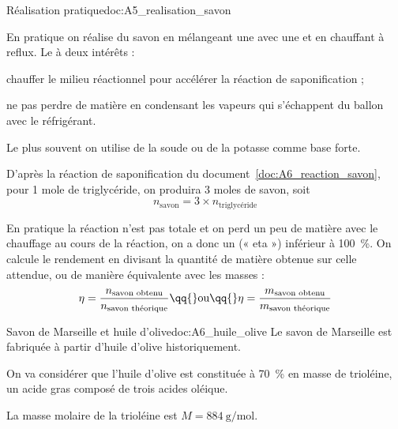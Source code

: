 \begin{doc}{Réalisation pratique}{doc:A5_realisation_savon}
  \begin{wrapfigure}{r}{0.4\linewidth}
    \centering
    \vspace*{-32pt}
  \end{wrapfigure}
  En pratique on réalise du savon en mélangeant une  avec une  et en chauffant à reflux.
  Le  à deux intérêts :
  \begin{listePoints}
    \item chauffer le milieu réactionnel pour accélérer la réaction de saponification ;
    \item ne pas perdre de matière en condensant les vapeurs qui s'échappent du ballon avec le réfrigérant.
  \end{listePoints}

  Le plus souvent on utilise de la soude  ou de la potasse  comme base forte.

  D'après la réaction de saponification du document~\ref{doc:A6_reaction_savon}, pour 1 mole de triglycéride, on produira 3 moles de savon, soit
  \begin{equation*}
    n_\text{savon} = 3\times n_\text{triglycéride}
  \end{equation*}

  En pratique la réaction n'est pas totale et on perd un peu de matière avec le chauffage au cours de la réaction, on a donc un  (« eta »)  inférieur à \qty{100}{\percent}.
  On calcule le rendement en divisant la quantité de matière obtenue sur celle attendue, ou de manière équivalente avec les masses :
  \begin{equation*}
    \eta = \dfrac{n_\text{savon obtenu}}{n_\text{savon théorique}}
    \qq{} \text{ou} \qq{}
    \eta = \dfrac{m_\text{savon obtenu}}{m_\text{savon théorique}}
  \end{equation*}
\end{doc}

\begin{doc}{Savon de Marseille et huile d'olive}{doc:A6_huile_olive}
  Le savon de Marseille est fabriquée à partir d'huile d'olive historiquement.
  
  On va considérer que l'huile d'olive est constituée à \qty{70}{\percent} en masse de trioléine, un acide gras composé de trois acides oléique.

  La masse molaire de la trioléine est $M = \qty{884}{\g\per\mole}$.
\end{doc}

